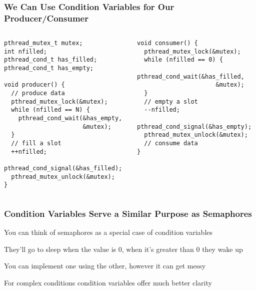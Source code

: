   \begin{frame}[fragile]
    \frametitle{We Can Use Condition Variables for Our Producer/Consumer}

    \begin{columns}
      \begin{column}{0.5\textwidth}
        \begin{lstlisting}
pthread_mutex_t mutex;
int nfilled;
pthread_cond_t has_filled;
pthread_cond_t has_empty;

void producer() {
  // produce data
  pthread_mutex_lock(&mutex);
  while (nfilled == N) {
    pthread_cond_wait(&has_empty,
                      &mutex);
  }
  // fill a slot
  ++nfilled;
  pthread_cond_signal(&has_filled);
  pthread_mutex_unlock(&mutex);
}
        \end{lstlisting}
      \end{column}
      \begin{column}{0.5\textwidth}
        \begin{lstlisting}
void consumer() {
  pthread_mutex_lock(&mutex);
  while (nfilled == 0) {
    pthread_cond_wait(&has_filled,
                      &mutex);
  }
  // empty a slot
  --nfilled;
  pthread_cond_signal(&has_empty);
  pthread_mutex_unlock(&mutex);
  // consume data
}
        \end{lstlisting}
      \end{column}
    \end{columns}
  \end{frame}

  \begin{frame}
    \frametitle{Condition Variables Serve a Similar Purpose as Semaphores}

    You can think of semaphores as a special case of condition variables

    \hspace{2em} They'll go to sleep when the value is 0, when it's greater
    than 0 they wake up

    \vspace{2em}

    You can implement one using the other, however it can get messy

    \vspace{2em}

    For complex conditions condition variables offer much better clarity
  \end{frame}

